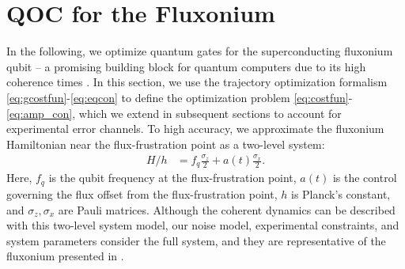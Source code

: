 \section{QOC for the Fluxonium \label{sec:fluxonium}}
In the following, we optimize quantum gates
for the superconducting fluxonium qubit -- a promising
building block for quantum computers due to its high
coherence times
\cite{earnest2018realization, lin2018demonstration,
  manucharyan2009fluxonium, somoroff2021millisecond, nguyen2019high,
  zhang2020universal}.
In this section, we use the trajectory optimization
formalism \eqref{eq:gcostfun}-\eqref{eq:eqcon}
to define the optimization problem \eqref{eq:costfun}-\eqref{eq:amp_con},
which we extend in subsequent sections to account
for experimental error channels.
To high accuracy, we approximate the fluxonium Hamiltonian near the flux-frustration
point as a two-level system:
\begin{align}
  H/h &= f_{q} \frac{\sigma_{z}}{2} + a(t) \frac{\sigma_{x}}{2}.
  \label{eq:hamiltonian}
\end{align}
Here, $f_{q}$ is the qubit frequency at the flux-frustration point,
$a(t)$ is the control governing the flux offset from the flux-frustration point,
$h$ is Planck's constant, and $\sigma_{z}, \sigma_{x}$
are Pauli matrices. Although the coherent dynamics can be described with this two-level
system model, our noise model, experimental constraints, and system parameters
consider the full system, and they are representative of the fluxonium
presented in \cite{zhang2020universal}.


